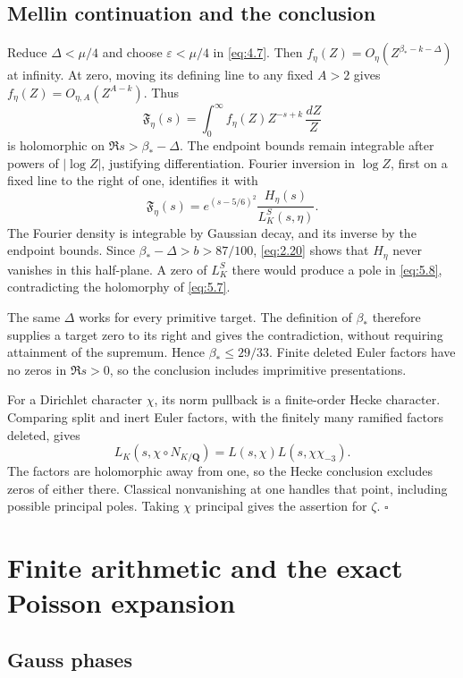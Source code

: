 \documentclass[11pt,a4paper]{article}
\begin{document}
\subsection{Mellin continuation and the conclusion}\label{sec:5.3}

Reduce \(\Delta<\mu/4\) and choose \(\varepsilon<\mu/4\) in \eqref{eq:4.7}. Then \(f_\eta(Z)=O_\eta(Z^{\beta_*-k-\Delta})\) at infinity. At zero, moving its defining line to any fixed \(A>2\) gives \(f_\eta(Z)=O_{\eta,A}(Z^{A-k})\). Thus \[
 \mathfrak F_\eta(s)=\int_0^\infty f_\eta(Z)Z^{-s+k}\,\frac{dZ}{Z}
\tag{5.7}\label{eq:5.7}
\] is holomorphic on \(\Re s>\beta_*-\Delta\). The endpoint bounds remain integrable after powers of \(|\log Z|\), justifying differentiation. Fourier inversion in \(\log Z\), first on a fixed line to the right of one, identifies it with \[
 \mathfrak F_\eta(s)=e^{(s-5/6)^2}\frac{H_\eta(s)}{L_K^S(s,\eta)}.
\tag{5.8}\label{eq:5.8}
\] The Fourier density is integrable by Gaussian decay, and its inverse by the endpoint bounds. Since \(\beta_*-\Delta>b>87/100\), \eqref{eq:2.20} shows that \(H_\eta\) never vanishes in this half-plane. A zero of \(L_K^S\) there would produce a pole in \eqref{eq:5.8}, contradicting the holomorphy of \eqref{eq:5.7}.

The same \(\Delta\) works for every primitive target. The definition of \(\beta_*\) therefore supplies a target zero to its right and gives the contradiction, without requiring attainment of the supremum. Hence \(\beta_*\le29/33\). Finite deleted Euler factors have no zeros in \(\Re s>0\), so the conclusion includes imprimitive presentations.

For a Dirichlet character \(\chi\), its norm pullback is a finite-order Hecke character. Comparing split and inert Euler factors, with the finitely many ramified factors deleted, gives \[
 L_K(s,\chi\circ N_{K/\mathbf Q})=L(s,\chi)L(s,\chi\chi_{-3}).
\] The factors are holomorphic away from one, so the Hecke conclusion excludes zeros of either there. Classical nonvanishing at one handles that point, including possible principal poles. Taking \(\chi\) principal gives the assertion for \(\zeta\). \hfill\(\square\)

\appendix
\section{Finite arithmetic and the exact Poisson expansion}\label{sec:A}

\subsection{Gauss phases}\label{sec:A.1}
\end{document}
